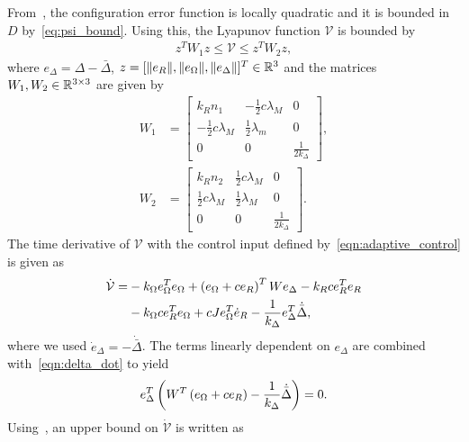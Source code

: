 \documentclass[10pt,fleqn]{IJCAS}  %
\begin{document}
\begin{multicols}{2}
From~, the configuration error function is locally quadratic and it is bounded in \( D \) by~\cref{eq:psi_bound}.
Using this, the Lyapunov function \( \mathcal{V} \) is bounded by
\begin{align*} %
	z^T W_1 z \leq \mathcal{V} \leq z^T W_2 z ,
\end{align*}
where \( e_\Delta = \Delta - \bar{\Delta} \), \( z = [\|e_R\|,\|e_\Omega\|,\|e_\Delta\|]^T\in\mathbb{R}^3 \) and the matrices \(W_1,W_2 \in \mathbb{R}^{3 \times 3}\) are given by
\begin{align*}
	W_1 & = \begin{bmatrix}
		k_R n_1 & -\frac{1}{2} c \lambda_M & 0 \\
		-\frac{1}{2} c \lambda_M & \frac{1}{2} \lambda_m & 0 \\
		0 & 0 & \frac{1}{2 k_\Delta}
	\end{bmatrix},\\
	W_2 & = \begin{bmatrix}
		k_R n_2 & \frac{1}{2} c \lambda_M & 0 \\
		\frac{1}{2} c \lambda_M & \frac{1}{2} \lambda_M & 0 \\
		0 & 0 & \frac{1}{2 k_\Delta}
	\end{bmatrix} .
\end{align*}
The time derivative of \( \mathcal{V}\) with the control input defined by~\cref{eqn:adaptive_control} is given as
\begin{align*}
	\dot{\mathcal{V}} =& - k_\Omega e_\Omega^T e_\Omega + \left( e_\Omega + c e_R \right)^T W e_\Delta - k_R c e_R^T e_R \nonumber\\
	&- k_\Omega c e_R^T e_\Omega + c J e_\Omega^T \dot{e}_R - \frac{1}{k_\Delta} e_\Delta^T \dot{\bar{\Delta}} , \label{eqn:vdot}
\end{align*}
where we used \( \dot{e}_\Delta = - \dot{\bar{\Delta}} \).
The terms linearly dependent on \( e_\Delta\) are combined with~\cref{eqn:delta_dot} to yield
\begin{align*}
	 e_\Delta^T \left( W^T \left( e_\Omega + c e_R \right) - \frac{1}{k_\Delta} \dot{\bar{\Delta}} \right) = 0 . 
\end{align*}
Using~, an upper bound on \( \dot{\mathcal{V}} \) is written as

\end{multicols}
\end{document}
